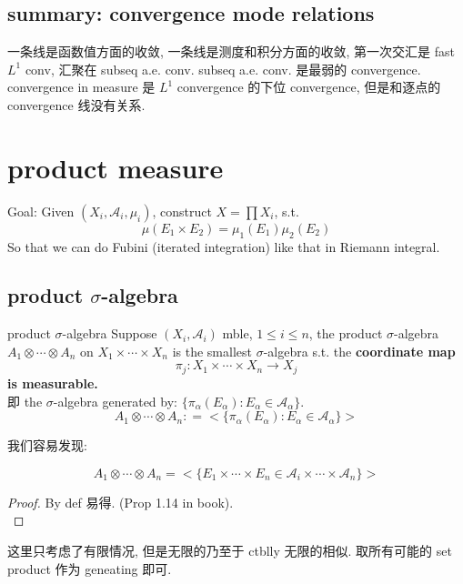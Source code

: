 \documentclass[lang=cn,11pt]{elegantbook}
\begin{document}
\section{summary: convergence mode relations}
一条线是函数值方面的收敛, 一条线是测度和积分方面的收敛,  第一次交汇是 fast $L^1$ conv, 汇聚在 subseq a.e. conv. subseq a.e. conv. 是最弱的 convergence.\\
convergence in measure 是 $L^1$ convergence 的下位 convergence, 但是和逐点的 convergence 线没有关系.




\chapter{product measure}

Goal: Given $(X_i, \mathcal{A}_i, \mu_i)$, construct $X = \prod X_i $, s.t. 
\[
\mu(E_1 \times E_2 )  = \mu_1(E_1) \mu_2(E_2)
\]
So that we can do Fubini (iterated integration) like that in Riemann integral.


\section{product $\sigma$-algebra}
\begin{definition}{product $\sigma$-algebra}
Suppose $(X_i, \mathcal{A}_i)$ mble, $1 \leq i\leq n$, the product $\sigma$-algebra $A_1 \otimes \cdots \otimes A_n$ on $X_1 \times \cdots \times X_n$ is the smallest $\sigma$-algebra s.t. the\textbf{ coordinate map }$$ \pi_j: X_1 \times \cdots \times X_n \rightarrow X_j$$\textbf{is measurable.}\\
即 the $\sigma$-algebra generated by: \(
\{  \pi_\alpha (E_\alpha) : E_\alpha  \in \mathcal{A_\alpha} \}
\). \[
A_1 \otimes \cdots \otimes A_n : = <\{  \pi_\alpha (E_\alpha) : E_\alpha  \in \mathcal{A_\alpha} \}>
\]

\end{definition}


我们容易发现:
\begin{proposition}
$$A_1 \otimes \cdots \otimes A_n = <\{  E_1\times \cdots \times E_n \in \mathcal{A}_i \times \cdots \times \mathcal{A}_n  \}>$$
\end{proposition}
\begin{proof}
    By def 易得. (Prop 1.14 in book).\\
\end{proof}
\begin{remark}
  这里只考虑了有限情况, 但是无限的乃至于 ctblly 无限的相似. 取所有可能的 set product 作为 geneating 即可.
\end{remark}
\end{document}
